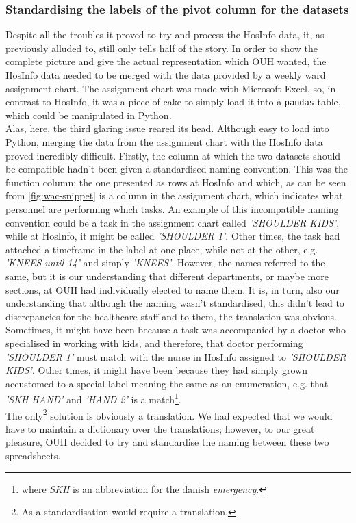 \subsubsection*{Standardising the labels of the pivot column for the datasets}
Despite all the troubles it proved to try and process the HosInfo data, it, as previously alluded to,  still only tells half of the story. In order to show the complete picture and give the actual representation which OUH wanted, the HosInfo data needed to be merged with the data provided by a weekly ward assignment chart. The assignment chart was made with Microsoft Excel, so, in contrast to HosInfo, it was a piece of cake to simply load it into a \texttt{pandas} table, which could be manipulated in Python.
\\
Alas, here, the third glaring issue reared its head. Although easy to load into Python, merging the data from the assignment chart with the HosInfo data proved incredibly difficult. Firstly, the column at which the two datasets should be compatible hadn't been given a standardised naming convention. This was the \gls{function} column; the one presented as rows at HosInfo and which, as can be seen from \autoref{fig:wac-snippet} is a column in the assignment chart, which indicates what personnel are performing which tasks. An example of this incompatible naming convention could be a task in the assignment chart called \emph{'SHOULDER KIDS'}, while at HosInfo, it might be called \emph{'SHOULDER 1'}. Other times, the task had attached a timeframe in the label at one place, while not at the other, e.g. \emph{'KNEES until 14'} and simply \emph{'KNEES'}. However, the names referred to the same, but it is our understanding that different departments, or maybe more sections, at OUH had individually elected to name them. It is, in turn, also our understanding that although the naming wasn't standardised, this didn't lead to discrepancies for the healthcare staff and to them, the translation was obvious. Sometimes, it might have been because a task was accompanied by a doctor who specialised in working with kids, and therefore, that doctor performing \emph{'SHOULDER 1'} must match with the nurse in HosInfo assigned to \emph{'SHOULDER KIDS'}. Other times, it might have been because they had simply grown accustomed to a special label meaning the same as an enumeration, e.g. that \emph{'SKH HAND'} and \emph{'HAND 2'} is a match\footnote{where \emph{SKH} is an abbreviation for the danish \emph{emergency}.}.
\\
The only\footnote{As a standardisation would require a translation.} solution is obviously a translation. We had expected that we would have to maintain a \gls{dictionary} over the translations; however, to our great pleasure, OUH decided to try and standardise the naming between these two spreadsheets.
